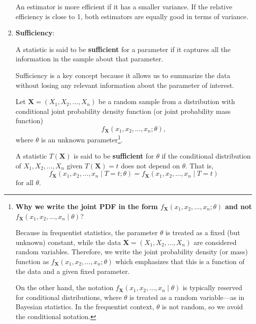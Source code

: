 \documentclass[twoside]{book}
\begin{document}
\begin{enumerate}
        An estimator is more efficient if it has a smaller variance. If the relative efficiency is close to 1, both estimators are equally good in terms of variance.

    \item \textbf{Sufficiency}:

    \begin{textbox}
    A statistic is said to be \textbf{sufficient} for a parameter if it captures all the information in the sample about that parameter.
    \end{textbox}

    Sufficiency is a key concept because it allows us to summarize the data without losing any relevant information about the parameter of interest.

    Let $\mathbf{X} = (X_1, X_2, \ldots, X_n)$ be a random sample from a distribution with conditional joint probability density function (or joint probability mass function) $$f_{\mathbf{X}}(x_1, x_2, \dots, x_n ; \theta),$$ where $\theta$ is an unknown parameter\footnote{\textbf{Why we write the joint PDF in the form $f_{\mathbf{X}}(x_1, x_2, \dots, x_n; \theta)$ and not $f_{\mathbf{X}}(x_1, x_2, \dots, x_n \mid \theta)$}?

    \noindent Because in frequentist statistics, the parameter $\theta$ is treated as a fixed (but unknown) constant, while the data $\mathbf{X} = (X_1, X_2, \dots, X_n)$ are considered random variables. Therefore, we write the joint probability density (or mass) function as
        $ f_{\mathbf{X}}(x_1, x_2, \dots, x_n; \theta) $
        which emphasizes that this is a function of the data and a given fixed parameter.

        On the other hand, the notation $f_{\mathbf{X}}(x_1, x_2, \dots, x_n \mid \theta)$ is typically reserved for conditional distributions, where $\theta$ is treated as a random variable—as in Bayesian statistics. In the frequentist context, $\theta$ is not random, so we avoid the conditional notation.}.

   \begin{textbox}
    A statistic $T(\mathbf{X})$ is said to be \textbf{sufficient} for $\theta$ if the conditional distribution of $X_1,X_2,\dots, X_n$ given $T(\mathbf{X}) = t$ does not depend on $\theta$. That is,
       \[
       f_{\mathbf{X}}(x_1, x_2, \dots, x_n \mid T = t; \theta) = f_{\mathbf{X}}(x_1, x_2, \dots, x_n \mid T = t)
       \]
       $ \text{for all } \theta $.
   \end{textbox}


\end{enumerate}
\end{document}
